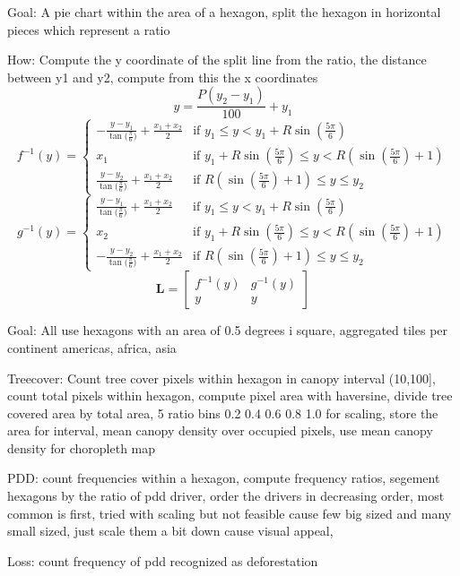 		Goal: A pie chart within the area of a hexagon, split the hexagon in horizontal pieces which represent a ratio

		How: Compute the y coordinate of the split line from the ratio, the distance between y1 and y2, compute from this the x coordinates
		\begin{equation}
		\label{eq:hexagon_ratio}
			y = \frac{P(y_2-y_1)}{100} + y_1
		\end{equation}
		\begin{equation}
		\label{eq:hexagon_left_intersection}
			f^{-1}(y) =
			\begin{cases} 
				-\frac{y - y_1}{\tan{(\frac{\pi}{6}})} + \frac{x_1 + x_2}{2} & \text{if } y_1 \le y < y_1 + R\sin{(\frac{5\pi}{6})} \\
				x_1 & \text{if } y_1 + R\sin{(\frac{5\pi}{6})} \le y < R(\sin{(\frac{5\pi}{6})} + 1) \\
				\frac{y - y_2}{\tan{(\frac{\pi}{6}})} + \frac{x_1 + x_2}{2} & \text{if } R(\sin{(\frac{5\pi}{6})} + 1) \le y \le y_2
			\end{cases}
		\end{equation}
		\begin{equation}
		\label{eq:hexagon_right_intersection}
			g^{-1}(y) = 
			\begin{cases} 
				\frac{y - y_1}{\tan{(\frac{\pi}{6}})} + \frac{x_1 + x_2}{2} & \text{if } y_1 \le y < y_1 + R\sin{(\frac{5\pi}{6})} \\
				x_2 & \text{if } y_1 + R\sin{(\frac{5\pi}{6})} \le y < R(\sin{(\frac{5\pi}{6})} + 1) \\
				-\frac{y - y_2}{\tan{(\frac{\pi}{6}})} + \frac{x_1 + x_2}{2} & \text{if } R(\sin{(\frac{5\pi}{6})} + 1) \le y \le y_2
			\end{cases}
		\end{equation}
		\begin{equation}
		\label{eq:hexagon_split_line}
			\mathbf{L} =
			\begin{bmatrix}
				f^{-1}(y) & g^{-1}(y) \\
				y & y
			\end{bmatrix}
		\end{equation}

		Goal: All use hexagons with an area of 0.5 degrees i square, aggregated tiles per continent americas, africa, asia

		Treecover: Count tree cover pixels within hexagon in canopy interval (10,100], count total pixels within hexagon, compute pixel area with haversine, divide tree covered area by total area, 5 ratio bins 0.2 0.4 0.6 0.8 1.0 for scaling, store the area for interval, mean canopy density over occupied pixels, use mean canopy density for choropleth map

		PDD: count frequencies within a hexagon, compute frequency ratios, segement hexagons by the ratio of pdd driver, order the drivers in decreasing order, most common is first, tried with scaling but not feasible cause few big sized and many small sized, just scale them a bit down cause visual appeal,

		Loss: count frequency of pdd recognized as deforestation 